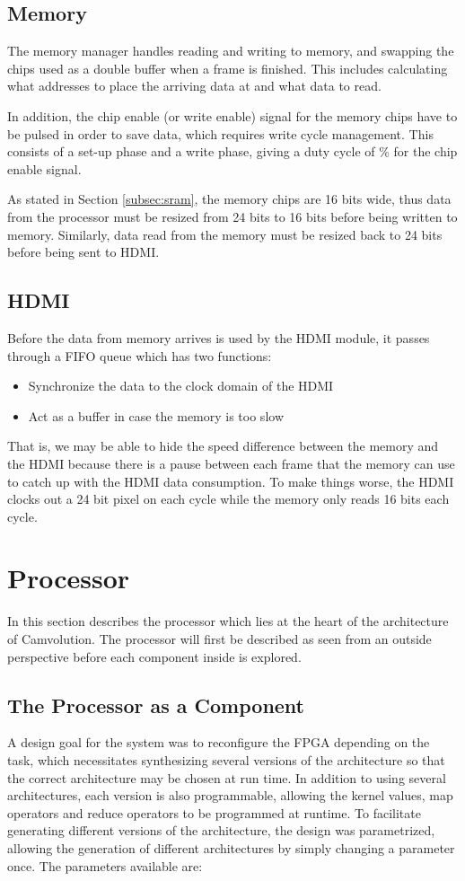 \subsection{Memory}
The memory manager handles reading and writing to memory, and swapping the chips used as a double buffer when a frame is finished.
This includes calculating what addresses to place the arriving data at and what data to read.

In addition, the chip enable (or write enable) signal for the memory chips have to be pulsed in order to save data, which requires write cycle management.
This consists of a set-up phase and a write phase, giving a duty cycle of \unit[50]{\%} for the chip enable signal.

As stated in Section \ref{subsec:sram}, the memory chips are 16 bits wide, thus data from the processor must be resized from 24 bits to 16 bits before being written to memory.
Similarly, data read from the memory must be resized back to 24 bits before being sent to HDMI.

\subsection{HDMI}
Before the data from memory arrives is used by the HDMI module, it passes through a FIFO queue which has two functions:
\begin{itemize}
    \item Synchronize the data to the clock domain of the HDMI
    \item Act as a buffer in case the memory is too slow
\end{itemize}

That is, we may be able to hide the speed difference between the memory and the HDMI because there is a pause between each frame that the memory can use to catch up with the HDMI data consumption.
To make things worse, the HDMI clocks out a 24 bit pixel on each cycle while the memory only reads 16 bits each cycle.

\section{Processor}
\label{sec:processor}
In this section describes the processor which lies at the heart of the architecture of Camvolution.
The processor will first be described as seen from an outside perspective before each component inside is explored.

\subsection{The Processor as a Component}
A design goal for the system was to reconfigure the FPGA depending on the task, which necessitates synthesizing several versions of the architecture so that the correct architecture may be chosen at run time.
In addition to using several architectures, each version is also programmable, allowing the kernel values, map operators and reduce operators to be programmed at runtime.
To facilitate generating different versions of the architecture, the design was parametrized, allowing the generation of different architectures by simply changing a parameter once.
The parameters available are:

